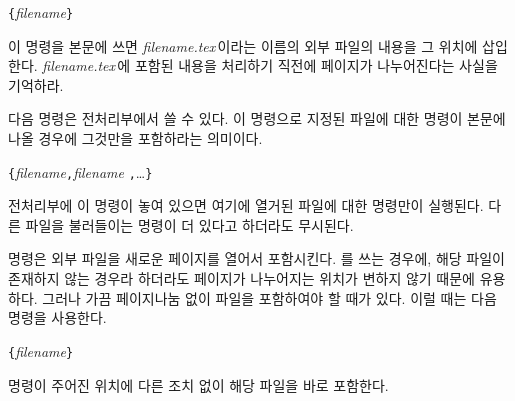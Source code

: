 \begin{lscommand}
\verb|{|\emph{filename}\verb|}|
\end{lscommand}
\noindent 이 명령을 본문에 쓰면 \emph{filename.tex}\,이라는 이름의 외부 파일의 내용을 
그 위치에 삽입한다. \emph{filename.tex}\,에 포함된 내용을 처리하기 직전에 
페이지가 나누어진다는 사실을 기억하라.

다음 명령은 전처리부에서 쓸 수 있다. 이 명령으로 지정된 파일에 대한 
\verb|| 명령이 본문에 나올 경우에 그것만을 포함하라는 의미이다.
\begin{lscommand}
\verb|{|\emph{filename}\verb|,|\emph{filename}%
\verb|,|\ldots\verb|}|
\end{lscommand}
\noindent 전처리부에 이 명령이 놓여 있으면 여기에 열거된 파일에 대한 
\verb|| 명령만이 실행된다. 다른 파일을 불러들이는 \verb|| 명령이 더 있다고 
하더라도 무시된다. 

 명령은 외부 파일을 새로운 페이지를 열어서 포함시킨다. 를 
쓰는 경우에, 해당 파일이 존재하지 않는 경우라 하더라도 페이지가 나누어지는 위치가 변하지 않기 때문에 유용하다. 
그러나 가끔 페이지나눔 없이 파일을 포함하여야 할 때가 있다. 이럴 때는 다음 명령을 사용한다.
\begin{lscommand}
\verb|{|\emph{filename}\verb|}|
\end{lscommand}
\noindent 명령이 주어진 위치에 다른 조치 없이 해당 파일을 바로 포함한다.

